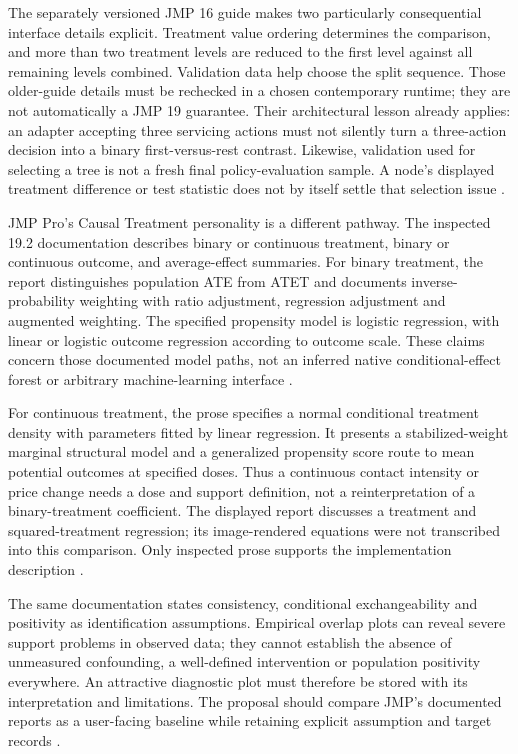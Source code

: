 The separately versioned JMP 16 guide makes two particularly consequential
interface details explicit. Treatment value ordering determines the
comparison, and more than two treatment levels are reduced to the first
level against all remaining levels combined. Validation data help choose
the split sequence. Those older-guide details must be rechecked in a
chosen contemporary runtime; they are not automatically a JMP 19 guarantee.
Their architectural lesson already applies: an adapter accepting three
servicing actions must not silently turn a three-action decision into a
binary first-versus-rest contrast. Likewise, validation used for selecting
a tree is not a fresh final policy-evaluation sample. A node's displayed
treatment difference or test statistic does not by itself settle that
selection issue \cite{exec13_ch_jmp_uplift}.

JMP Pro's Causal Treatment personality is a different pathway. The inspected
19.2 documentation describes binary or continuous treatment, binary or
continuous outcome, and average-effect summaries. For binary treatment,
the report distinguishes population ATE from ATET and documents
inverse-probability weighting with ratio adjustment, regression adjustment
and augmented weighting. The specified propensity model is logistic
regression, with linear or logistic outcome regression according to
outcome scale. These claims concern those documented model paths, not an
inferred native conditional-effect forest or arbitrary machine-learning
interface \cite{exec13_ch_jmp_causal}.

For continuous treatment, the prose specifies a normal conditional
treatment density with parameters fitted by linear regression. It presents
a stabilized-weight marginal structural model and a generalized propensity
score route to mean potential outcomes at specified doses. Thus a continuous
contact intensity or price change needs a dose and support definition,
not a reinterpretation of a binary-treatment coefficient. The displayed
report discusses a treatment and squared-treatment regression; its
image-rendered equations were not transcribed into this comparison.
Only inspected prose supports the implementation description
\cite{exec13_ch_jmp_causal}.

The same documentation states consistency, conditional exchangeability and
positivity as identification assumptions. Empirical overlap plots can
reveal severe support problems in observed data; they cannot establish the
absence of unmeasured confounding, a well-defined intervention or population
positivity everywhere. An attractive diagnostic plot must therefore be
stored with its interpretation and limitations. The proposal should
compare JMP's documented reports as a user-facing baseline while retaining
explicit assumption and target records \cite{exec13_ch_jmp_causal}.

